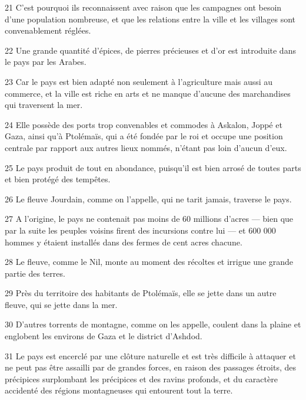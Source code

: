 \par 21 C'est pourquoi ils reconnaissent avec raison que les campagnes ont besoin d'une population nombreuse, et que les relations entre la ville et les villages sont convenablement réglées.

\par 22 Une grande quantité d'épices, de pierres précieuses et d'or est introduite dans le pays par les Arabes.

\par 23 Car le pays est bien adapté non seulement à l'agriculture mais aussi au commerce, et la ville est riche en arts et ne manque d'aucune des marchandises qui traversent la mer.

\par 24 Elle possède des ports trop convenables et commodes à Askalon, Joppé et Gaza, ainsi qu'à Ptolémaïs, qui a été fondée par le roi et occupe une position centrale par rapport aux autres lieux nommés, n'étant pas loin d'aucun d'eux.

\par 25 Le pays produit de tout en abondance, puisqu'il est bien arrosé de toutes parts et bien protégé des tempêtes.

\par 26 Le fleuve Jourdain, comme on l'appelle, qui ne tarit jamais, traverse le pays.

\par 27 A l'origine, le pays ne contenait pas moins de 60 millions d'acres — bien que par la suite les peuples voisins firent des incursions contre lui — et 600 000 hommes y étaient installés dans des fermes de cent acres chacune.

\par 28 Le fleuve, comme le Nil, monte au moment des récoltes et irrigue une grande partie des terres.

\par 29 Près du territoire des habitants de Ptolémaïs, elle se jette dans un autre fleuve, qui se jette dans la mer.

\par 30 D'autres torrents de montagne, comme on les appelle, coulent dans la plaine et englobent les environs de Gaza et le district d'Ashdod.

\par 31 Le pays est encerclé par une clôture naturelle et est très difficile à attaquer et ne peut pas être assailli par de grandes forces, en raison des passages étroits, des précipices surplombant les précipices et des ravins profonds, et du caractère accidenté des régions montagneuses qui entourent tout la terre.

